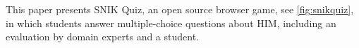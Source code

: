 \documentclass{IOS-Book-Article}     %
\newcommand{\citet}{\cite}%
\newcommand{\citep}{\cite}%
\begin{document}
This paper presents SNIK Quiz, an open source\footnotemark{} browser game, see \cref{fig:snikquiz}, in which students answer multiple-choice questions about HIM, including an evaluation by domain experts and a student.
%
%
%
\end{document}
